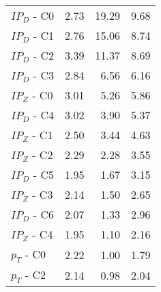 \begin{table}[ht]
\begin{tabular}{lrrr}
\midrule
%
$IP_{D}$ - C0 &         2.73 &            19.29 &              9.68 \\
$IP_{D}$ - C1 &         2.76 &            15.06 &              8.74 \\
$IP_{D}$ - C2 &         3.39 &            11.37 &              8.69 \\
$IP_{D}$ - C3 &         2.84 &             6.56 &              6.16 \\
\vspace{\everyNthRowSpace}
$IP_{Z}$ - C0 &         3.01 &             5.26 &              5.86 \\
$IP_{D}$ - C4 &         3.02 &             3.90 &              5.37 \\
$IP_{Z}$ - C1 &         2.50 &             3.44 &              4.63 \\
$IP_{Z}$ - C2 &         2.29 &             2.28 &              3.55 \\
$IP_{D}$ - C5 &         1.95 &             1.67 &              3.15 \\
\vspace{\everyNthRowSpace}
$IP_{Z}$ - C3 &         2.14 &             1.50 &              2.65 \\
$IP_{D}$ - C6 &         2.07 &             1.33 &              2.96 \\
$IP_{Z}$ - C4 &         1.95 &             1.10 &              2.16 \\
$p_{T}$ - C0  &         2.22 &             1.00 &              1.79 \\
$p_{T}$ - C2  &         2.14 &             0.98 &              2.04 \\

\end{tabular}
\end{table}
